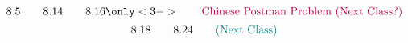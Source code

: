 
\begin{frame}{}

  \pause
  \[
    8.5 \qquad 8.14 \qquad 8.16 \only<3->{\qquad \text{\purple{Chinese Postman Problem (Next Class?)}}}
  \]
  \[
    8.18 \qquad 8.24 \qquad \text{\textcolor{teal}{(Next Class)}}
  \]
\end{frame}
